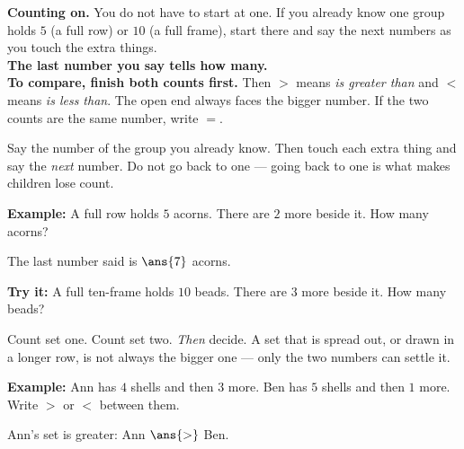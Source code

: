 \documentclass[12pt]{article}
\begin{document}

\begin{formulabox}
\textbf{Counting on.} You do not have to start at one. If you already know one
group holds $5$ (a full row) or $10$ (a full frame), start there and say the
next numbers as you touch the extra things.\\[3pt]
\textbf{The last number you say tells how many.}\\[3pt]
\textbf{To compare, finish both counts first.} Then $>$ means \emph{is greater
than} and $<$ means \emph{is less than}. The open end always faces the bigger
number. If the two counts are the same number, write $=$.
\end{formulabox}


\begin{formulabox}
Say the number of the group you already know. Then touch each extra thing and
say the \emph{next} number. Do not go back to one --- going back to one is what
makes children lose count.
\end{formulabox}

\begin{examplebox}
\textbf{Example:} A full row holds $5$ acorns. There are $2$ more beside it.
How many acorns?

The last number said is $\ans{7}$ acorns.
\end{examplebox}

\begin{tryitbox}
\textbf{Try it:} A full ten-frame holds $10$ beads. There are $3$ more beside
it. How many beads?\\[2pt]
\end{tryitbox}


\begin{formulabox}
Count set one. Count set two. \emph{Then} decide. A set that is spread out, or
drawn in a longer row, is not always the bigger one --- only the two numbers
can settle it.
\end{formulabox}

\begin{examplebox}
\textbf{Example:} Ann has $4$ shells and then $3$ more. Ben has $5$ shells and
then $1$ more. Write $>$ or $<$ between them.

Ann's set is greater: Ann $\ans{>}$ Ben.
\end{examplebox}
\end{document}
